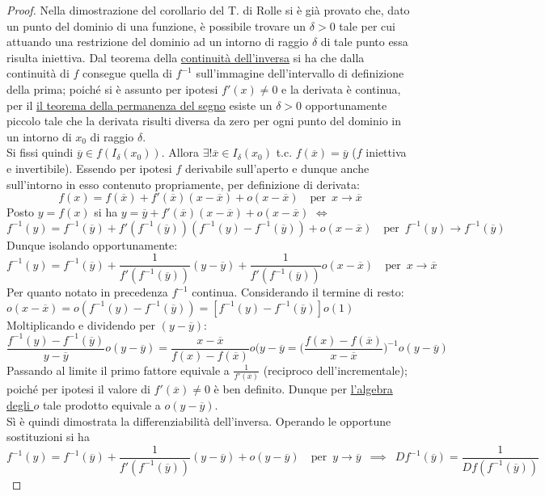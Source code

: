 \documentclass[10pt, oneside]{book}
\theoremstyle{plain}
\begin{document}
\begin{proof}
Nella dimostrazione del corollario del T. di Rolle si è già provato che, dato un punto del dominio di una funzione, è possibile trovare un $\delta > 0$ tale per cui attuando una restrizione del dominio ad un intorno di raggio $\delta$ di tale punto essa risulta iniettiva. Dal teorema della \hyperlink{inversa}{continuità dell'inversa} si ha che dalla continuità di $f$ consegue quella di $f^{-1}$ sull'immagine dell'intervallo di definizione della prima; poiché si è assunto per ipotesi $f'(x) \neq 0$ e la derivata è continua, per il \hyperref[subsubsec:perman]{il teorema della permanenza del segno} esiste un $\delta > 0$ opportunamente piccolo tale che la derivata risulti diversa da zero per ogni punto del dominio in un intorno di $x_0$ di raggio $\delta$. \\
Si fissi quindi $\overline{y} \in f(I_\delta(x_0))$. Allora $\exists! \overline{x} \in I_\delta(x_0)$ t.c. $f(\overline{x}) = \overline{y}$ ($f$ iniettiva e invertibile). Essendo per ipotesi $f$ derivabile sull'aperto e dunque anche sull'intorno in esso contenuto propriamente, per definizione di derivata:
\[f(x) = f(\overline{x}) + f'(\overline{x}) (x - \overline{x}) + o (x - \overline{x}) \quad \textrm{per} \enspace x \rightarrow \overline{x}\]
Posto $y = f(x)$ si ha $y = \overline{y} + f'(\overline{x}) (x - \overline{x}) + o (x - \overline{x})$ $\Leftrightarrow$ $f^{-1}(y) = f^{-1}(\overline{y}) + f'(f^{-1}(\overline{y})) (f^{-1}(y) - f^{-1}(\overline{y})) + o (x - \overline{x}) \quad \textrm{per} \enspace f^{-1}(y) \rightarrow f^{-1}(\overline{y})$
\\Dunque isolando opportunamente:
\[f^{-1}(y) = f^{-1}(\overline{y}) + \frac{1}{f'(f^{-1}(\overline{y}))}(y - \overline{y}) + \frac{1}{f'(f^{-1}(\overline{y}))} o(x - \overline{x}) \quad \textrm{per} \enspace x \rightarrow \overline{x}\]
Per quanto notato in precedenza $f^{-1}$ continua. Considerando il termine di resto: $o(x - \overline{x}) = o (f^{-1}(y) - f^{-1}(\overline{y})) = [f^{-1}(y) - f^{-1}(\overline{y})]o(1)$
\hypertarget{cus}{Moltiplicando e dividendo} per $(y - \overline{y})$:
\[\frac{f^{-1}(y) - f^{-1}(\overline{y})}{y - \overline{y}} o(y - \overline{y}) = \frac{x - \overline{x}}{f(x) - f(\overline{x})}o(y - \overline{y} = \bigg(\frac{f(x) - f(\overline{x})}{x - \overline{x}}\bigg)^{-1}o(y - \overline{y})\]
Passando al limite il primo fattore equivale a $\frac{1}{f'(\overline{x})}$ (reciproco dell'incrementale); poiché per ipotesi il valore di $f'(\overline{x}) \neq 0$ è ben definito. Dunque per \hyperlink{opiccoli}{l'algebra degli $o$} tale prodotto equivale a $o(y - \overline{y})$.
\\Sì è quindi dimostrata la differenziabilità dell'inversa. Operando le opportune sostituzioni si ha
\[f^{-1}(y) = f^{-1}(\overline{y}) + \frac{1}{f'(f^{-1}(\overline{y}))}(y - \overline{y}) + o(y - \overline{y}) \quad \textrm{per} \enspace y \rightarrow \overline{y} \enspace \implies \enspace Df^{-1}(\overline{y}) = \frac{1}{Df(f^{-1}(\overline{y}))}\]
\end{proof}
\end{document}
